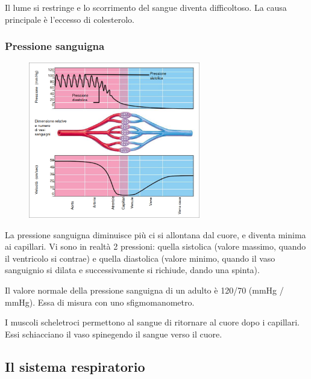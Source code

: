 \documentclass[a4paper]{article}
\begin{document}

Il lume si restringe e lo scorrimento del sangue diventa difficoltoso.
La causa principale è l'eccesso di colesterolo.

\subsubsection{Pressione sanguigna}


\setlength{\intextsep}{0pt}%
\begin{figure}
    \includegraphics[width=7.5cm]{./pressione.png}
    \vspace{-1cm}
\end{figure}

La pressione sanguigna diminuisce più ci si allontana dal cuore, e diventa minima ai capillari.
Vi sono in realtà 2 pressioni:
quella sistolica (valore massimo, quando il ventricolo si contrae) e quella diastolica
(valore minimo, quando il vaso sanguignio si dilata e successivamente si richiude, dando una spinta).

Il valore normale della pressione sanguigna di un adulto è 120/70 (mmHg / mmHg).
Essa di misura con uno sfigmomanometro.

I muscoli scheletroci permettono al sangue di ritornare al cuore dopo i capillari.
Essi schiacciano il vaso spinegendo il sangue verso il cuore.
\wrapfill

\subsection{Il sistema respiratorio}
\end{document}
